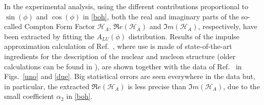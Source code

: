 \documentclass[times, twoside]{PosWhiPap}
\begin{document}
In the experimental analysis, using the different contributions proportional to
$\sin(\phi)$ and $\cos(\phi)$ in \eqref{boh}, both the real and imaginary parts 
of the so-called Compton Form Factor $\mathcal{H}_{A}$, 
$\Re e(\mathcal{H}_{A})$ and $\Im m(\mathcal{H}_{A})$, respectively,
have been extracted by fitting the $A_{LU}(\phi)$ distribution. Results of the 
impulse approximation calculation of Ref.~\cite{Fucini:2018gso}, {\color{red} 
where use is made of state-of-the-art ingredients for the description of the 
nuclear and nucleon structure} (older calculations can be found in
\cite{Liuti:2005gi,Guzey:2003jh}), are shown together with the data of 
Ref.~\cite{Hattawy:2017woc} in Figs.~\ref{uno} and \ref{due}.
Big statistical errors are seen everywhere in the data but, in particular, the extracted $\Re 
e(\mathcal{H}_{A})$ is less precise than $\Im m(\mathcal{H}_{A})$, due to the small 
coefficient $\alpha_2$ in \eqref{boh}.
\end{document}
